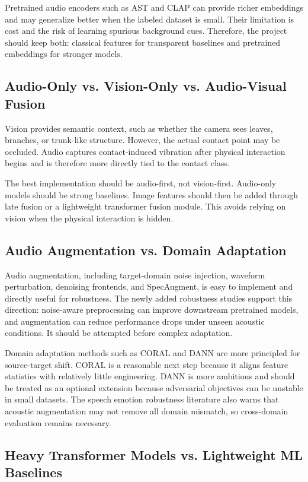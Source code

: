 \documentclass[12pt,a4paper]{article}
\begin{document}
Pretrained audio encoders such as AST and CLAP can provide richer embeddings and may generalize better when the labeled dataset is small. Their limitation is cost and the risk of learning spurious background cues. Therefore, the project should keep both: classical features for transparent baselines and pretrained embeddings for stronger models.

\subsection{Audio-Only vs. Vision-Only vs. Audio-Visual Fusion}

Vision provides semantic context, such as whether the camera sees leaves, branches, or trunk-like structure. However, the actual contact point may be occluded. Audio captures contact-induced vibration after physical interaction begins and is therefore more directly tied to the contact class.

The best implementation should be audio-first, not vision-first. Audio-only models should be strong baselines. Image features should then be added through late fusion or a lightweight transformer fusion module. This avoids relying on vision when the physical interaction is hidden.

\subsection{Audio Augmentation vs. Domain Adaptation}

Audio augmentation, including target-domain noise injection, waveform perturbation, denoising frontends, and SpecAugment, is easy to implement and directly useful for robustness. The newly added robustness studies support this direction: noise-aware preprocessing can improve downstream pretrained models, and augmentation can reduce performance drops under unseen acoustic conditions. It should be attempted before complex adaptation.

Domain adaptation methods such as CORAL and DANN are more principled for source-target shift. CORAL is a reasonable next step because it aligns feature statistics with relatively little engineering. DANN is more ambitious and should be treated as an optional extension because adversarial objectives can be unstable in small datasets. The speech emotion robustness literature also warns that acoustic augmentation may not remove all domain mismatch, so cross-domain evaluation remains necessary.

\subsection{Heavy Transformer Models vs. Lightweight ML Baselines}
\end{document}

